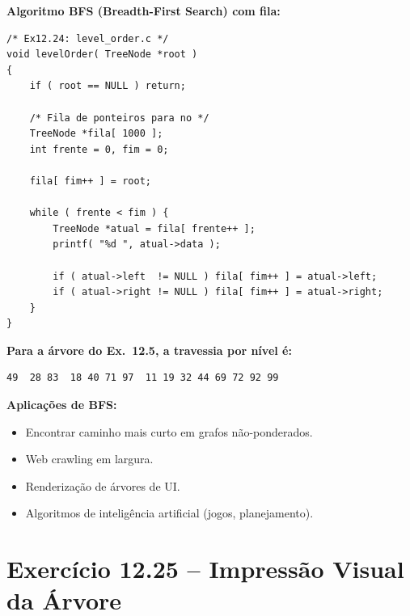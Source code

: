 \documentclass[12pt,a4paper]{article}
\begin{document}
\begin{respostabox}
\textbf{Algoritmo BFS (Breadth-First Search) com fila:}

\begin{lstlisting}
/* Ex12.24: level_order.c */
void levelOrder( TreeNode *root )
{
    if ( root == NULL ) return;

    /* Fila de ponteiros para no */
    TreeNode *fila[ 1000 ];
    int frente = 0, fim = 0;

    fila[ fim++ ] = root;

    while ( frente < fim ) {
        TreeNode *atual = fila[ frente++ ];
        printf( "%d ", atual->data );

        if ( atual->left  != NULL ) fila[ fim++ ] = atual->left;
        if ( atual->right != NULL ) fila[ fim++ ] = atual->right;
    }
}
\end{lstlisting}

\textbf{Para a árvore do Ex.~12.5, a travessia por nível é:}
\begin{lstlisting}
49  28 83  18 40 71 97  11 19 32 44 69 72 92 99
\end{lstlisting}

\textbf{Aplicações de BFS:}
\begin{itemize}[noitemsep]
  \item Encontrar caminho mais curto em grafos não-ponderados.
  \item Web crawling em largura.
  \item Renderização de árvores de UI.
  \item Algoritmos de inteligência artificial (jogos, planejamento).
\end{itemize}
\end{respostabox}

\newpage

\section{Exercício 12.25 -- Impressão Visual da Árvore}
\end{document}
